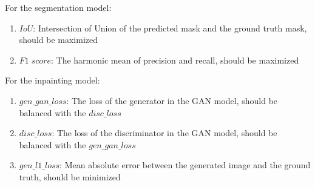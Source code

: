 \documentclass[10pt,twocolumn,letterpaper]{article}
\begin{document}
For the segmentation model:
\begin{enumerate}
    \item $IoU$: Intersection of Union of the predicted mask and the ground truth mask, should be maximized
    \item $F1\;score$: The harmonic mean of precision and recall, should be maximized
\end{enumerate}

For the inpainting model:
\begin{enumerate}
    \item $gen\_gan\_loss$: The loss of the generator in the GAN model, should be balanced with the $disc\_loss$
    \item $disc\_loss$: The loss of the discriminator in the GAN model, should be balanced with the $gen\_gan\_loss$
    \item $gen\_l1\_loss$: Mean absolute error between the generated image and the ground truth, should be minimized
\end{enumerate}
\end{document}
